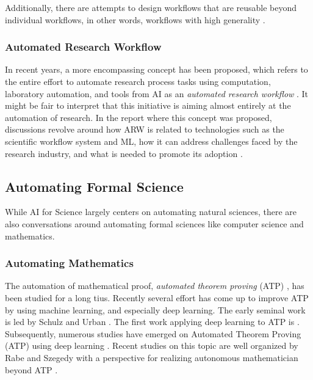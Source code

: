 Additionally, there are attempts to design workflows that are reusable beyond individual workflows, in other words, workflows with high generality \cite{hardisty2020canonical}.


\subsubsection{Automated Research Workflow}

In recent years, a more encompassing concept has been proposed, which refers to the entire effort to automate research process tasks using computation, laboratory automation, and tools from AI as an \textit{automated research workflow} \cite{national2022automated}. It might be fair to interpret that this initiative is aiming almost entirely at the automation of research. In the report where this concept was proposed, discussions revolve around how ARW is related to technologies such as the scientific workflow system and ML, how it can address challenges faced by the research industry, and what is needed to promote its adoption \cite{national2022automated}.


\subsection{Automating Formal Science}
While AI for Science largely centers on automating natural sciences, there are also conversations around automating formal sciences like computer science and mathematics.

\subsubsection{Automating Mathematics}
The automation of mathematical proof, \textit{automated theorem proving} (ATP) , has been studied for a long tius. Recently several effort has come up to improve ATP by using machine learning, and especially deep learning. The early seminal work is led by Schulz \cite{schulz2001learning} and Urban \cite{urban2004mptp,urban2008malarea}. The first work applying deep learning to ATP is \cite{irving2016deepmath}. Subsequently, numerous studies have emerged on Automated Theorem Proving (ATP) using deep learning \cite{bansal2019holist}. Recent studies on this topic are well organized by Rabe and Szegedy with a perspective for realizing autonomous mathematician beyond ATP \cite{rabe2021towards}.

